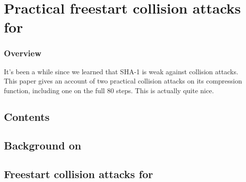 \part[Collisions explicites pour la fonction de compression de \shaone]
    {Practical freestart collision attacks for \shaone} 
\label{part:sha-1}

\section*{Overview}
It's been a while since we learned that SHA-1 is weak against collision attacks. This paper gives an account of two practical collision attacks on its compression
function, including one on the full 80 steps. This is actually quite nice.


\cleardoublepage
\chapter*{Contents}
\parttoc




\chapter[Contexte sur \shaone]
        {Background on \shaone}
\label{cha:shaone_cont}





\chapter[Collisions à initialisation libres pour \shaone]
        {Freestart collision attacks for \shaone}
\label{cha:shaone_new}









\FloatBarrier




\FloatBarrier
